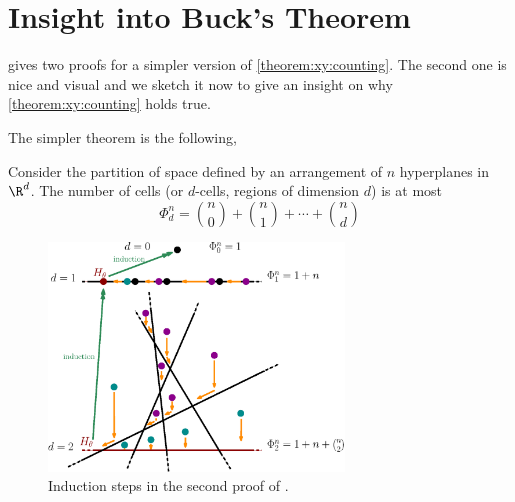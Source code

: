 \section{Insight into Buck's Theorem}

\citet*{matousek:2002} gives two proofs for a simpler version of
\ref{theorem:xy:counting}. The second one is nice and visual and we
sketch it now to give an insight on why \ref{theorem:xy:counting} holds
true.

The simpler theorem is the following,
\begin{theorem}
Consider the partition of space defined by an arrangement of \(n\) hyperplanes
in \(\R^d\). The number of cells (or \(d\)-cells, regions of dimension \(d\))
is at most
\begin{displaymath}
\Phi_d^n = \binom{n}{0} + \binom{n}{1} + \cdots + \binom{n}{d}
\end{displaymath}
\end{theorem}

\begin{figure}
\centering
\includegraphics[width=0.7\textwidth]{fig/x+y/buck/arrangement}
\caption{Induction steps in the second proof of \citet*{matousek:2002}.}
\label{fig:xy:buck:arrangement}
\end{figure}

